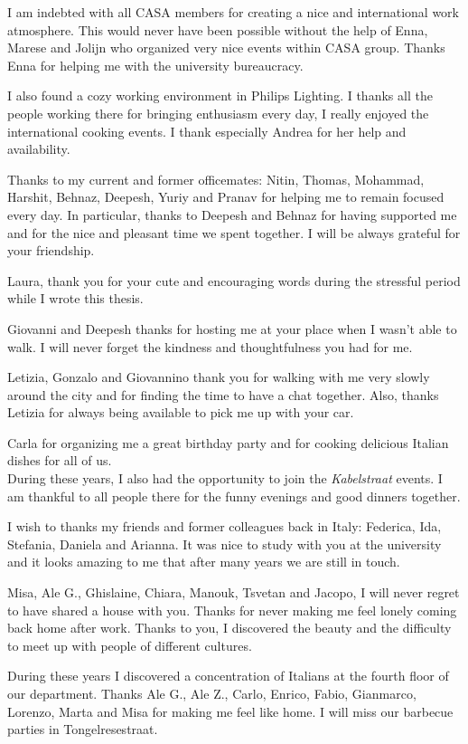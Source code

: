 I am indebted with all CASA members for creating a nice and international work atmosphere. This would never have been possible without the help of Enna, Marese and Jolijn who organized very nice events within CASA group. Thanks Enna for helping me with the university bureaucracy.

I also found a cozy working environment in Philips Lighting. I thanks all the people working there for bringing enthusiasm every day, I really enjoyed the international cooking events. I thank especially Andrea for her help and availability.

Thanks to my current and former officemates: Nitin, Thomas, Mohammad, Harshit, Behnaz, Deepesh, Yuriy and Pranav for helping me to remain focused every day.
In particular, thanks to Deepesh and Behnaz for having supported me and for the nice and pleasant time we spent together. I will be always grateful for your friendship. 

Laura, thank you for your cute and encouraging words during the stressful period while I wrote this thesis.

Giovanni and Deepesh thanks for hosting me at your place when I wasn't able to walk. I will never forget the kindness and thoughtfulness you had for me.


Letizia, Gonzalo and Giovannino thank you for walking with me very slowly around the city and for finding the time to have a chat together. Also, thanks Letizia for always being available to pick me up with your car.

Carla for organizing me a great birthday party and for cooking delicious Italian dishes for all of us. \\

During these years, I also had the opportunity to join the \emph{Kabelstraat} events. I am thankful to all people there for the funny evenings and good dinners together.

I wish to thanks my friends and former colleagues back in Italy: Federica, Ida, Stefania, Daniela and Arianna. It was nice to study with you at the university and it looks amazing to me that after many years we are still in touch.

Misa, Ale G., Ghislaine, Chiara, Manouk, Tsvetan and Jacopo, I will never regret to have shared a house with you. Thanks for never making me feel lonely coming back home after work. Thanks to you, I discovered the beauty and the difficulty to meet up with people of different cultures.

During these years I discovered a concentration of Italians at the fourth floor of our department. Thanks Ale G., Ale Z., Carlo, Enrico, Fabio, Gianmarco, Lorenzo, Marta and Misa for making me feel like home. I will miss our barbecue parties in Tongelresestraat.\\

